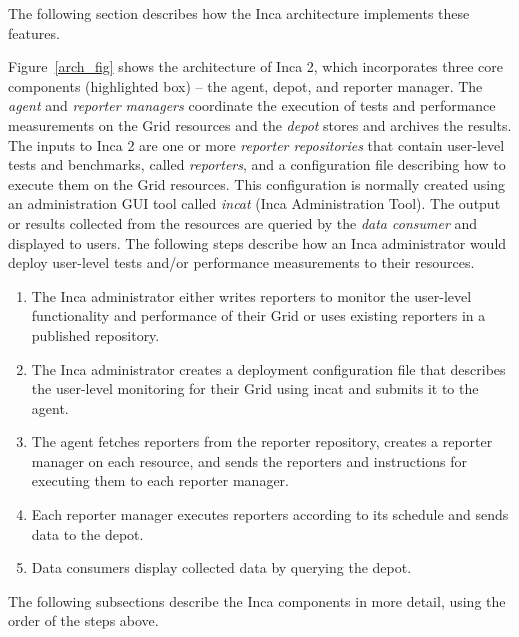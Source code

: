 \documentclass[times,10pt,twocolumn]{article}
\begin{document}
\noindent The following section describes how the Inca architecture implements
these features.


Figure~\ref{arch_fig} shows the architecture of Inca 2, which
incorporates three core
components (highlighted box) -- the agent, depot, and reporter manager.
The \textit{agent} and \textit{reporter managers} coordinate the execution of
tests and performance measurements on the Grid resources and the
\textit{depot} stores and archives the results.  The inputs to Inca 2 are one
or more \textit{reporter repositories} that contain user-level tests and
benchmarks, called \textit{reporters}, and a configuration file describing how
to execute them on the Grid resources.  This configuration is normally created
using an administration GUI tool
called \textit{incat} (Inca Administration Tool).  The output or results
collected from the resources are queried by the \textit{data consumer} and
displayed to users.  The following steps describe how an Inca administrator
would deploy user-level tests and/or performance measurements to their
resources.

\begin{enumerate}

\item The Inca
administrator either writes reporters to monitor the user-level functionality
and performance of their Grid or uses existing
reporters in a published repository.

\item The Inca administrator creates a deployment configuration file that
describes the user-level monitoring for their Grid using incat and submits it
to the agent.

\item The agent fetches reporters from the reporter repository, creates a
reporter manager on each resource, and sends the reporters and instructions for
executing them to each reporter manager.

\item Each reporter manager executes reporters according to its schedule and
sends data to the depot.

\item Data consumers display collected data by querying the depot.
\end{enumerate}

\noindent The following subsections describe the Inca components in more
detail, using the order of the steps above.
\end{document}
